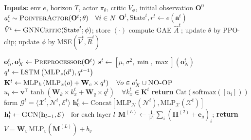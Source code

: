 \begin{algorithm}
\caption{\textsc{PLATO}}
\label{alg:plato}
\scriptsize
\begin{algorithmic}[1]
\State \textbf{Inputs:} env $e$, horizon $T$, actor $\pi_\theta$, critic $V_\phi$, initial observation $\mathbf{O}^0$
  \State $a^t_i\sim \textsc{PointerActor}(\mathbf{O}^t; \theta) \quad \forall i \in N$
  \State $\mathbf{O}^t,\text{State}^t,r^t\gets e(\mathbf{a}^t)$
  \State $\hat V^t \gets \textsc{GNNCritic}(\text{State}^t;\phi)$;\; store $(\cdot)$
  \State  compute GAE $\hat A^t$;\; update $\theta$ by PPO-clip;\; update $\phi$ by MSE$(\hat V^t,\hat R^t)$
\EndFor
\Statex

  \State $\mathbf{o}_n^t,\mathbf{o}_X^t\gets \textsc{Preprocessor}(\mathbf{O}^t)$ 
  \State $\mathbf{s}^t\!\gets\![\mu,\sigma^2,\min,\max](\mathbf{o}^t_{N})$
  \State $q^t \gets \mathrm{LSTM}\left (\textsc{MLP}_s(d^t),q^{t-1} \right )$
  \State $\mathbf{K}^t \gets \mathrm{MLP}_k\left (\mathrm{MLP}_x(o) + \mathbf{W}_c \times q^t \right ) \quad \forall o \in o^t_X \cup \textsc{NO-OP}$
  \State $u_i\!\gets\!\mathbf{v}^\top\tanh(\mathbf{W}_k \times k^t_x+\mathbf{W}_q\times q^t) \quad \forall k_x^t \in \mathbf{K}^t$ 
  \State  \textbf{return} $\mathrm{Cat}(\mathrm{softmax}([u_i]))$
\EndProcedure
\Statex
{} 
  \State form $\mathcal{G}^t=\langle\mathcal{X}^t,\mathcal{N}^t,\mathcal{E}^t\rangle$
  \State $\mathbf{h}_0^t \gets \text{Concat}\left [\text{MLP}_{\mathcal{N}}\left ( \mathcal{N}^t \right ), \text{MLP}_\mathcal{X}\left(\mathcal{X}^t \right ) \right ]$
  \State $\mathbf{h}^t_l \gets \textsc{GCN}(\mathbf{h}_{l-1}, \mathcal{E}) \quad \text{for each layer }l$
  \State $\mathbf{M}^{(L)}\!\gets\!\frac{1}{|\mathcal{V}|}\sum_i(\mathbf{H}^{(2)}+\mathbf{e}_g)_i$;\;
  \State \textbf{return} $V=\mathbf{W}_v\,\mathrm{MLP}_v(\mathbf{M}^{(L)})+b_v$
\EndProcedure
\end{algorithmic}
\end{algorithm}

